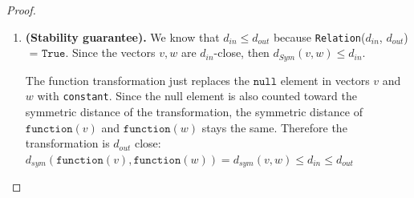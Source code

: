 \documentclass[11pt,a4paper]{article}
\begin{document}
\begin{proof}
\begin{enumerate}
\item \textbf{(Stability guarantee).}     We know that $d_{in} \leq d_{out}$ because \texttt{Relation}($d_{in}$, $d_{out}$) $\texttt{ = True}$. Since the vectors $v, w$ are $d_{in}$-close, then $d_{Sym}(v, w) \leq d_{in}$.
    
    The function transformation just replaces the $\texttt{null}$ element in vectors $v$ and $w$ with \texttt{constant}. Since the null element is also counted toward the symmetric distance of the transformation, the symmetric distance of $\texttt{function}(v)$ and $\texttt{function}(w)$ stays the same. Therefore the transformation is $d_{out}$ close: $d_{sym}(\texttt{function}(v), \texttt{function}(w)) = d_{sym}(v, w) \leq d_{in} \leq d_{out}$

\end{enumerate}
\end{proof}
\end{document}
